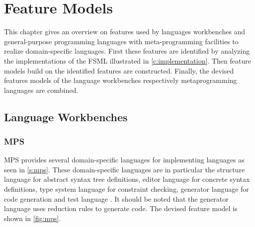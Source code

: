 \chapter{Feature Models}

This chapter gives an overview on features used by languages workbenches and general-purpose programming languages with meta-programming facilities to realize domain-specific languages.
First these features are identified by analyzing the implementations of the FSML illustrated in \autoref{c:implementation}.
Then feature models build on the identified features are constructed.
Finally, the devised features models of the language workbenches respectively metaprogramming languages are combined.

\section{Language Workbenches}

\subsection{MPS}

MPS provides several domain-specific languages for implementing languages as seen in \autoref{s:mps}.
These domain-specific languages are in particular the structure language for abstract syntax tree definitions, editor language for concrete syntax definitions, type system language for constraint checking, generator language for code generation and test language \cite{mpsdocumentation}.
It should be noted that the generator language uses reduction rules to generate code.
The devised feature model is shown in \autoref{fig:mps}.

